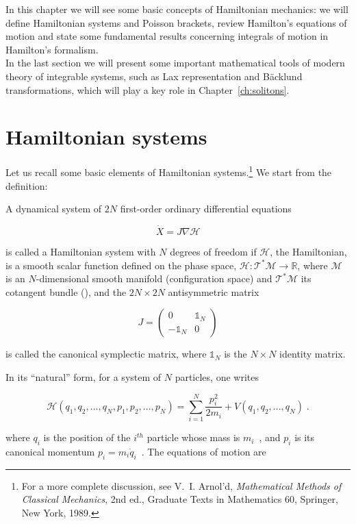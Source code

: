 In this chapter we will see some basic concepts of Hamiltonian mechanics: we will define Hamiltonian systems and Poisson brackets, review Hamilton's equations of motion and state some fundamental results concerning integrals of motion in Hamilton's formalism. \\
In the last section we will present some important mathematical tools of modern theory of integrable systems, such as Lax representation and Bäcklund transformations, which will play a key role in Chapter~\ref{ch:solitons}.

\section{Hamiltonian systems}
Let us recall some basic elements of Hamiltonian systems.\footnote{For a more complete discussion, see V.~I. Arnol'd, \textit{Mathematical Methods of Classical Mechanics}, 2nd ed., Graduate Texts in Mathematics 60, Springer, New York, 1989.} We start from the definition:

\begin{defi}
A dynamical system of $2N$ first-order ordinary differential equations

\begin{equation}
    \dot X = J \nabla \mathcal{H}
\end{equation}

is called a Hamiltonian system with $N$ degrees of freedom if $\mathcal{H}$, the Hamiltonian, is a smooth scalar function defined on the phase space, $\mathcal{H}: \mathcal{T}^\ast \mathcal{M} \to \mathbb{R}$, where $\mathcal{M}$ is an $N$-dimensional smooth manifold (configuration space) and $\mathcal{T}^\ast \mathcal{M}$ its cotangent bundle (\cite{arnold2007mathematical}), and the $2N \times 2N$ antisymmetric matrix

\[J = 
\begin{pmatrix}
0 & \mathbb{1}_N \\
-\mathbb{1}_N  & 0
\end{pmatrix}\]

is called the canonical symplectic matrix, where $\mathbb{1}_N$ is the $N \times N$ identity matrix.
\end{defi}

In its ``natural'' form, for a system of $N$ particles, one writes

\[\mathcal{H}(q_1,q_2,...,q_N,p_1,p_2,...,p_N) = \sum_{i=1}^N \frac{p_i^2}{2m_i} + V(q_1,q_2,...,q_N)\;.\]

where $q_i$ is the position of the $i^{th}$ particle whose mass is $m_i$ , and $p_i$ is its canonical momentum $p_i = m_i \dot q_i$ . The equations of motion are

